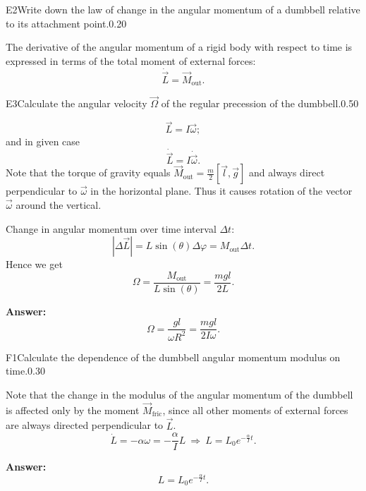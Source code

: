 \documentclass[11pt,a4paper]{article}
\begin{document}
\begin{solcard}{E2}{Write down the law of change in the angular momentum of a dumbbell relative to its attachment point.}{0.20}

The derivative of the angular momentum of a rigid body with respect to time is expressed in terms of the total moment of external forces: \begin{equation} \dot{\vec{L}} = \vec{M}_{\text{out}}. \end{equation}

\end{solcard}

\begin{solcard}{E3}{Calculate the angular velocity $\vec{\Omega}$ of the regular precession of the dumbbell.}{0.50}

$$\vec{L} = I\vec{\omega};$$ and in given case $$\dot{\vec{L}} = I\dot{\vec{\omega}}.$$ Note that the torque of gravity equals $\vec{M}_{\text{out}} = \frac{m}{2}\left[\vec{l},\vec{g}\right]$ and always direct perpendicular to $\vec{\omega}$ in the horizontal plane. Thus it causes rotation of the vector $\vec{\omega}$ around the vertical.


Change in angular momentum over time interval $\Delta t$: $$|\Delta \vec{L}| = L\sin(\theta)\Delta \varphi = M_{\text{out}}\Delta t.$$ Hence we get $$\Omega = \frac{M_{\text{out}}}{L \sin(\theta)} = \frac{mgl}{2L}.$$

\par\smallskip\noindent\textbf{Answer:} $$\Omega = \frac{gl}{\omega R^2} = \frac{mgl}{2I\omega}.$$
\end{solcard}

\begin{solcard}{F1}{Calculate the dependence of the dumbbell angular momentum modulus on time.}{0.30}

Note that the change in the modulus of the angular momentum of the dumbbell is affected only by the moment $\vec{M}_{\text{fric}}$, since all other moments of external forces are always directed perpendicular to $\vec{L}$. $$\dot{L} = - \alpha \omega = - \frac{\alpha}{I}L~\Rightarrow~L = L_0e^{-\frac{\alpha}{I}t}.$$

\par\smallskip\noindent\textbf{Answer:} $$L = L_0e^{-\frac{\alpha}{I}t}.$$
\end{solcard}
\end{document}
